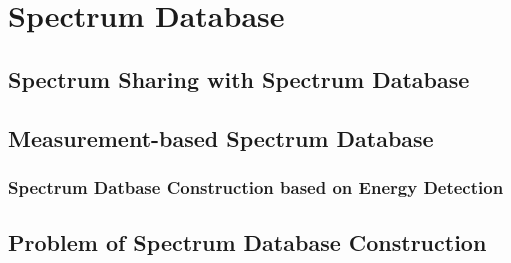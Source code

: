 \chapter[Spectrum Database]{Spectrum Database}
\label{chapter:CR}

\section{Spectrum Sharing with Spectrum Database}

\section{Measurement-based Spectrum Database}
    \subsection{Spectrum Datbase Construction based on Energy Detection}

\section{Problem of Spectrum Database Construction }

